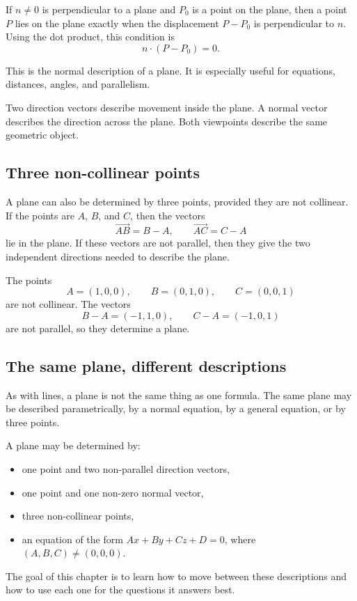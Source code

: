 If \(n\ne0\) is perpendicular to a plane and \(P_0\) is a point on the plane, then a point \(P\) lies on the plane exactly when the displacement \(P-P_0\) is perpendicular to \(n\). Using the dot product, this condition is
\[
n\cdot(P-P_0)=0.
\]

This is the normal description of a plane. It is especially useful for equations, distances, angles, and parallelism.

\begin{remarkbox}
Two direction vectors describe movement inside the plane. A normal vector describes the direction across the plane. Both viewpoints describe the same geometric object.
\end{remarkbox}

\subsection*{Three non-collinear points}

A plane can also be determined by three points, provided they are not collinear. If the points are \(A\), \(B\), and \(C\), then the vectors
\[
\overrightarrow{AB}=B-A,
\qquad
\overrightarrow{AC}=C-A
\]
lie in the plane. If these vectors are not parallel, then they give the two independent directions needed to describe the plane.

\begin{examplebox}
The points
\[
A=(1,0,0),
\qquad
B=(0,1,0),
\qquad
C=(0,0,1)
\]
are not collinear. The vectors
\[
B-A=(-1,1,0),
\qquad
C-A=(-1,0,1)
\]
are not parallel, so they determine a plane.
\end{examplebox}

\subsection*{The same plane, different descriptions}

As with lines, a plane is not the same thing as one formula. The same plane may be described parametrically, by a normal equation, by a general equation, or by three points.

\begin{summarybox}
A plane may be determined by:
\begin{itemize}
\item one point and two non-parallel direction vectors,
\item one point and one non-zero normal vector,
\item three non-collinear points,
\item an equation of the form \(Ax+By+Cz+D=0\), where \((A,B,C)\ne(0,0,0)\).
\end{itemize}
\end{summarybox}

The goal of this chapter is to learn how to move between these descriptions and how to use each one for the questions it answers best.